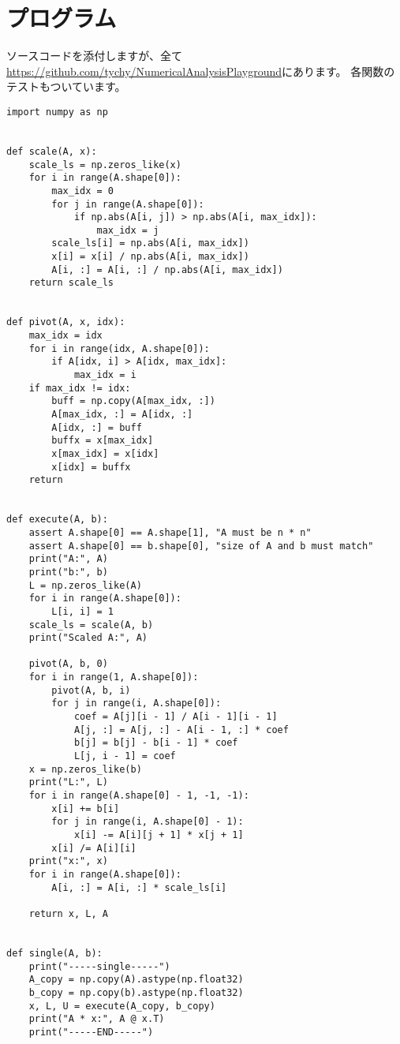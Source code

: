 \documentclass{jsarticle}
\begin{document}
\section{プログラム}
ソースコードを添付しますが、全て
\href{https://github.com/tychy/NumericalAnalysisPlayground}{https://github.com/tychy/NumericalAnalysisPlayground}にあります。
各関数のテストもついています。
\begin{lstlisting}[caption=スクリプトファイル名,label=参照ラベル]
import numpy as np


def scale(A, x):
    scale_ls = np.zeros_like(x)
    for i in range(A.shape[0]):
        max_idx = 0
        for j in range(A.shape[0]):
            if np.abs(A[i, j]) > np.abs(A[i, max_idx]):
                max_idx = j
        scale_ls[i] = np.abs(A[i, max_idx])
        x[i] = x[i] / np.abs(A[i, max_idx])
        A[i, :] = A[i, :] / np.abs(A[i, max_idx])
    return scale_ls


def pivot(A, x, idx):
    max_idx = idx
    for i in range(idx, A.shape[0]):
        if A[idx, i] > A[idx, max_idx]:
            max_idx = i
    if max_idx != idx:
        buff = np.copy(A[max_idx, :])
        A[max_idx, :] = A[idx, :]
        A[idx, :] = buff
        buffx = x[max_idx]
        x[max_idx] = x[idx]
        x[idx] = buffx
    return


def execute(A, b):
    assert A.shape[0] == A.shape[1], "A must be n * n"
    assert A.shape[0] == b.shape[0], "size of A and b must match"
    print("A:", A)
    print("b:", b)
    L = np.zeros_like(A)
    for i in range(A.shape[0]):
        L[i, i] = 1
    scale_ls = scale(A, b)
    print("Scaled A:", A)

    pivot(A, b, 0)
    for i in range(1, A.shape[0]):
        pivot(A, b, i)
        for j in range(i, A.shape[0]):
            coef = A[j][i - 1] / A[i - 1][i - 1]
            A[j, :] = A[j, :] - A[i - 1, :] * coef
            b[j] = b[j] - b[i - 1] * coef
            L[j, i - 1] = coef
    x = np.zeros_like(b)
    print("L:", L)
    for i in range(A.shape[0] - 1, -1, -1):
        x[i] += b[i]
        for j in range(i, A.shape[0] - 1):
            x[i] -= A[i][j + 1] * x[j + 1]
        x[i] /= A[i][i]
    print("x:", x)
    for i in range(A.shape[0]):
        A[i, :] = A[i, :] * scale_ls[i]

    return x, L, A


def single(A, b):
    print("-----single-----")
    A_copy = np.copy(A).astype(np.float32)
    b_copy = np.copy(b).astype(np.float32)
    x, L, U = execute(A_copy, b_copy)
    print("A * x:", A @ x.T)
    print("-----END-----")



\end{lstlisting}
\end{document}
